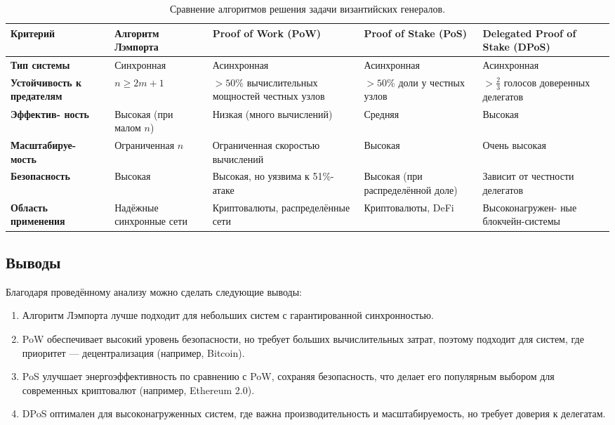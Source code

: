 \begin{table}[h!]
\centering
\begin{tabular}{|m{2.6cm}|m{3cm}|m{3cm}|m{3cm}|m{3cm}|}
\hline
\textbf{Критерий} & \textbf{Алгоритм Лэмпорта} & \textbf{Proof of Work (PoW)} & \textbf{Proof of Stake (PoS)} & \textbf{Delegated Proof of Stake (DPoS)} \\ \hline
\textbf{Тип системы} & Синхронная & Асинхронная & Асинхронная & Асинхронная \\ \hline
\textbf{Устойчивость к предателям} & \(n \geq 2m + 1\) & \(> 50\%\) вычислительных мощностей честных узлов & \(> 50\%\) доли у честных узлов & \(> \frac{2}{3}\) голосов доверенных делегатов \\ \hline
\textbf{Эффектив- ность} & Высокая (при малом \(n\)) & Низкая (много вычислений) & Средняя & Высокая \\ \hline
\textbf{Масштабируе- мость} & Ограниченная \(n\) & Ограниченная скоростью вычислений & Высокая & Очень высокая \\ \hline
\textbf{Безопасность} & Высокая & Высокая, но уязвима к 51\%-атаке & Высокая (при распределённой доле) & Зависит от честности делегатов \\ \hline
\textbf{Область применения} & Надёжные синхронные сети & Криптовалюты, распределённые сети & Криптовалюты, DeFi & Высоконагружен- ные блокчейн-системы \\ \hline
\end{tabular}
\caption{Сравнение алгоритмов решения задачи византийских генералов.}
\label{table:compare}
\end{table}


\subsection*{Выводы}

\hspace{1.25cm}
Благодаря проведённому анализу можно сделать следующие выводы:

\begin{enumerate}
    \item Алгоритм Лэмпорта лучше подходит для небольших систем с гарантированной синхронностью.
    \item PoW обеспечивает высокий уровень безопасности, но требует больших вычислительных затрат, поэтому подходит для систем, где приоритет — децентрализация (например, Bitcoin).
    \item PoS улучшает энергоэффективность по сравнению с PoW, сохраняя безопасность, что делает его популярным выбором для современных криптовалют (например, Ethereum 2.0).
    \item DPoS оптимален для высоконагруженных систем, где важна производительность и масштабируемость, но требует доверия к делегатам.
\end{enumerate}

\newpage